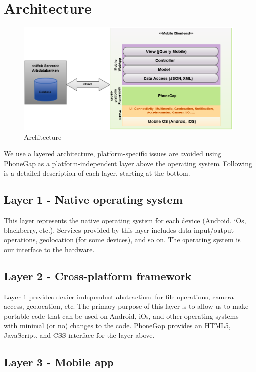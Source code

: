 \section{Architecture}
\begin{figure}[htb]
	\centering
	\includegraphics[width=1.0\textwidth]{architecture/architecture.png}
	\caption{Architecture}
	\label{fig:architecture}
\end{figure}

We use a layered architecture, platform-specific issues are avoided using
PhoneGap as a platform-independent layer above the operating system. Following
is a detailed description of each layer, starting at the bottom.

\subsection{Layer 1 - Native operating system}

This layer represents the native operating system for each device (Android, iOs,
blackberry, etc.). Services provided by this layer includes data input/output
operations, geolocation (for some devices), and so on. The operating system is 
our interface to the hardware.

\subsection{Layer 2 - Cross-platform framework}

Layer 1 provides device independent abstractions for file operations, camera
access, geolocation, etc. The primary purpose of this layer is to allow us to
make portable code that can be used on Android, iOs, and other operating systems
with minimal (or no) changes to the code. PhoneGap provides an HTML5,
JavaScript, and CSS interface for the layer above.

\subsection{Layer 3 - Mobile app}


